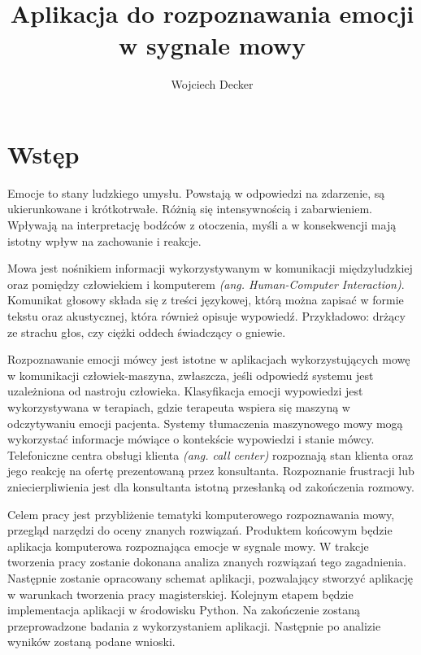 \documentclass[a4paper,12pt,twoside,openany]{report}
\title{Aplikacja do rozpoznawania emocji w sygnale mowy}
\author{Wojciech Decker}
\newcommand{\ang}[1]{\textit{(ang. #1)}}
\begin{document}
\maketitle
\chapter{Wstęp}
\label{ch:wstep}
Emocje to stany ludzkiego umysłu.
Powstają w odpowiedzi na zdarzenie, są ukierunkowane i krótkotrwałe.
Różnią się intensywnością i zabarwieniem.
Wpływają na interpretację bodźców z otoczenia,
myśli a w konsekwencji mają istotny wpływ na zachowanie i reakcje.

Mowa jest nośnikiem informacji wykorzystywanym w komunikacji międzyludzkiej
oraz pomiędzy człowiekiem i komputerem \ang{Human-Computer Interaction}.
Komunikat głosowy składa się z treści językowej,
którą można zapisać w formie tekstu
oraz akustycznej, która również opisuje wypowiedź. Przykładowo:
drżący ze strachu głos, czy ciężki oddech świadczący o gniewie.

Rozpoznawanie emocji mówcy jest istotne w aplikacjach wykorzystujących mowę w komunikacji człowiek-maszyna,
zwłaszcza, jeśli odpowiedź systemu jest uzależniona od nastroju człowieka.
Klasyfikacja emocji wypowiedzi jest wykorzystywana w terapiach,
gdzie terapeuta wspiera się maszyną w odczytywaniu emocji pacjenta.
Systemy tłumaczenia maszynowego mowy mogą wykorzystać informacje mówiące o kontekście wypowiedzi i stanie mówcy.
Telefoniczne centra obsługi klienta \ang{call center} rozpoznają stan klienta
oraz jego reakcję na ofertę prezentowaną przez konsultanta.
Rozpoznanie frustracji lub zniecierpliwienia jest dla konsultanta istotną przesłanką od zakończenia rozmowy.

Celem pracy jest przybliżenie tematyki komputerowego rozpoznawania mowy,
przegląd narzędzi do oceny znanych rozwiązań.
Produktem końcowym będzie aplikacja komputerowa rozpoznająca emocje w sygnale mowy.
W trakcje tworzenia pracy zostanie dokonana analiza znanych rozwiązań tego zagadnienia.
Następnie zostanie opracowany schemat aplikacji,
pozwalający stworzyć aplikację w warunkach tworzenia pracy magisterskiej.
Kolejnym etapem będzie implementacja aplikacji w środowisku Python.
Na zakończenie zostaną przeprowadzone badania z wykorzystaniem aplikacji.
Następnie po analizie wyników zostaną podane wnioski.
\end{document}
